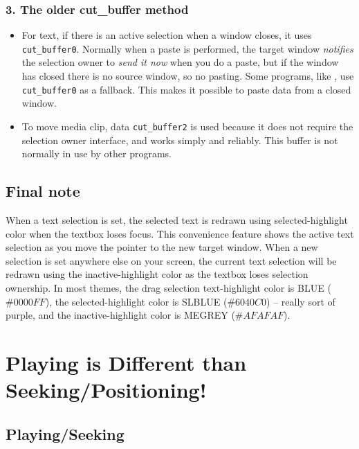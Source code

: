 \subsubsection*{3. The older cut\_buffer method}%
\label{ssub:older_cut_buffer_method}

\begin{itemize}
    \item For text, if there is an active selection when a window closes, it uses \texttt{cut\_buffer0}.  Normally when a paste is performed, the target window \textit{notifies} the selection owner to \textit{send it now} when you do a paste, but if the window has closed there is no source window, so no pasting.  Some programs, like \CGG{}, use \texttt{cut\_buffer0} as a fallback.  This makes it possible to paste data from a closed window.
    \item To move media clip, data \texttt{cut\_buffer2} is used because it does not require the selection owner interface, and works simply and reliably.  This buffer is not normally in use by other programs.
\end{itemize}

\subsection*{Final note}%
\label{sub:final_note}

When a text selection is set, the selected text is redrawn using selected-highlight color when the textbox loses focus.  This convenience feature shows the active text selection as you move the pointer to the new target window.  When a new selection is set anywhere else on your screen, the current text selection will be redrawn using the inactive-highlight color as the textbox loses selection ownership.  In most \CGG{} themes, the drag selection text-highlight color is BLUE ($\#0000FF$), the selected-highlight color is SLBLUE ($\#6040C0$) -- really sort of purple, and the inactive-highlight color is MEGREY ($\#AFAFAF$).

\section{Playing is Different than Seeking/Positioning!}%
\label{sec:playing_seeking_positioning}

\subsection{Playing/Seeking}%
\label{sub:playing_seeking}

